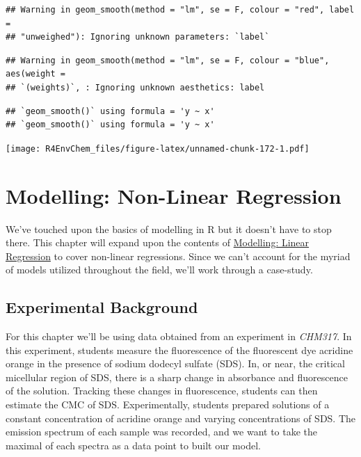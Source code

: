 \documentclass[
]{book}
\begin{document}
\begin{verbatim}
## Warning in geom_smooth(method = "lm", se = F, colour = "red", label =
## "unweighed"): Ignoring unknown parameters: `label`
\end{verbatim}

\begin{verbatim}
## Warning in geom_smooth(method = "lm", se = F, colour = "blue", aes(weight =
## `(weights)`, : Ignoring unknown aesthetics: label
\end{verbatim}

\begin{verbatim}
## `geom_smooth()` using formula = 'y ~ x'
## `geom_smooth()` using formula = 'y ~ x'
\end{verbatim}

\texttt{[image: R4EnvChem\_files/figure-latex/unnamed-chunk-172-1.pdf]}

\hypertarget{modelling-non-linear-regression}{%
\chapter{Modelling: Non-Linear Regression}\label{modelling-non-linear-regression}}

We've touched upon the basics of modelling in R but it doesn't have to stop there. This chapter will expand upon the contents of \protect\hyperlink{modelling-linear-regression}{Modelling: Linear Regression} to cover non-linear regressions. Since we can't account for the myriad of models utilized throughout the field, we'll work through a case-study.

\hypertarget{experimental-background}{%
\section{Experimental Background}\label{experimental-background}}

For this chapter we'll be using data obtained from an experiment in \emph{CHM317}. In this experiment, students measure the fluorescence of the fluorescent dye acridine orange in the presence of sodium dodecyl sulfate (SDS). In, or near, the critical micellular region of SDS, there is a sharp change in absorbance and fluorescence of the solution. Tracking these changes in fluorescence, students can then estimate the CMC of SDS. Experimentally, students prepared solutions of a constant concentration of acridine orange and varying concentrations of SDS. The emission spectrum of each sample was recorded, and we want to take the maximal of each spectra as a data point to built our model.
\end{document}
